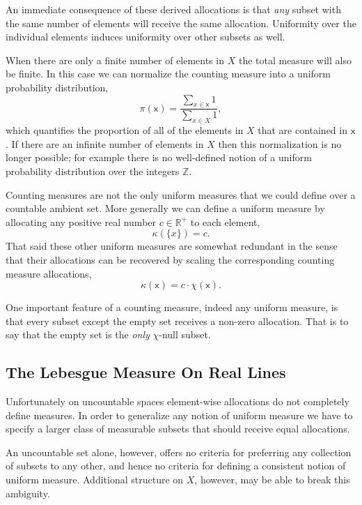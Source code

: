 \documentclass[
  letterpaper,
  DIV=11,
  numbers=noendperiod]{scrartcl}
\begin{document}
An immediate consequence of these derived allocations is that \emph{any}
subset with the same number of elements will receive the same
allocation. Uniformity over the individual elements induces uniformity
over other subsets as well.

When there are only a finite number of elements in \(X\) the total
measure will also be finite. In this case we can normalize the counting
measure into a uniform probability distribution, \[
\pi ( \mathsf{x} ) =
\frac{ \sum_{x \in \mathsf{x}} 1 }{ \sum_{x \in X} 1 },
\] which quantifies the proportion of all of the elements in \(X\) that
are contained in \(\mathsf{x}\). If there are an infinite number of
elements in \(X\) then this normalization is no longer possible; for
example there is no well-defined notion of a uniform probability
distribution over the integers \(\mathbb{Z}\).

Counting measures are not the only uniform measures that we could define
over a countable ambient set. More generally we can define a uniform
measure by allocating any positive real number \(c \in \mathbb{R}^{+}\)
to each element, \[
\kappa(\{ x \}) = c.
\] That said these other uniform measures are somewhat redundant in the
sense that their allocations can be recovered by scaling the
corresponding counting measure allocations, \[
\kappa ( \mathsf{x} ) = c \cdot \chi ( \mathsf{x} ).
\]

One important feature of a counting measure, indeed any uniform measure,
is that every subset except the empty set receives a non-zero
allocation. That is to say that the empty set is the \emph{only}
\(\chi\)-null subset.

\hypertarget{sec:lebesgue}{%
\subsection{The Lebesgue Measure On Real Lines}\label{sec:lebesgue}}

Unfortunately on uncountable spaces element-wise allocations do not
completely define measures. In order to generalize any notion of uniform
measure we have to specify a larger class of measurable subsets that
should receive equal allocations.

An uncountable set alone, however, offers no criteria for preferring any
collection of subsets to any other, and hence no criteria for defining a
consistent notion of uniform measure. Additional structure on \(X\),
however, may be able to break this ambiguity.
\end{document}
